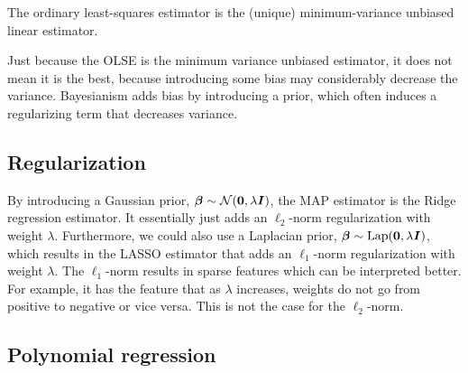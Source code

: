 \begin{theorem}
    The ordinary least-squares estimator is the (unique) minimum-variance unbiased linear estimator.
\end{theorem}

Just because the OLSE is the minimum variance unbiased estimator, it does not mean it is the best,
because introducing some bias may considerably decrease the variance. Bayesianism adds bias by
introducing a prior, which often induces a regularizing term that decreases variance.

\subsection{Regularization}

By introducing a Gaussian prior, $\bm{\beta} \sim \mathcal{N}(\bm{0}, \lambda \bm{I})$, the MAP
estimator is the Ridge regression estimator. It essentially just adds an $\ell_2$-norm
regularization with weight $\lambda$. Furthermore, we could also use a Laplacian prior,
$\bm{\beta} \sim \mathrm{Lap}(\bm{0}, \lambda \bm{I})$, which results in the LASSO estimator
that adds an $\ell_1$-norm regularization with weight $\lambda$. The $\ell_1$-norm results in
sparse features which can be interpreted better. For example, it has the feature that as $\lambda$
increases, weights do not go from positive to negative or vice versa. This is not the case for the
$\ell_2$-norm.

\subsection{Polynomial regression}

